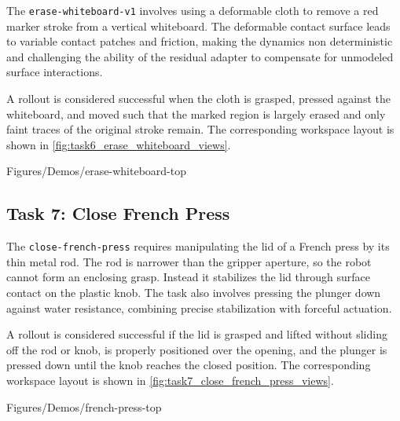 The \texttt{erase-whiteboard-v1} involves using a deformable cloth to remove a red marker stroke from a vertical whiteboard. The deformable contact surface leads to variable contact patches and friction, making the dynamics non deterministic and challenging the ability of the residual adapter to compensate for unmodeled surface interactions.

A rollout is considered successful when the cloth is grasped, pressed against the whiteboard, and moved such that the marked region is largely erased and only faint traces of the original stroke remain. The corresponding workspace layout is shown in \cref{fig:task6_erase_whiteboard_views}.

{Figures/Demos/erase-whiteboard-top}

\subsection{Task 7: Close French Press}
\label{sec:task:close_french_press}

The \texttt{close-french-press} requires manipulating the lid of a French press by its thin metal rod. The rod is narrower than the gripper aperture, so the robot cannot form an enclosing grasp. Instead it stabilizes the lid through surface contact on the plastic knob. The task also involves pressing the plunger down against water resistance, combining precise stabilization with forceful actuation.

A rollout is considered successful if the lid is grasped and lifted without sliding off the rod or knob, is properly positioned over the opening, and the plunger is pressed down until the knob reaches the closed position. The corresponding workspace layout is shown in \cref{fig:task7_close_french_press_views}.

{Figures/Demos/french-press-top}


